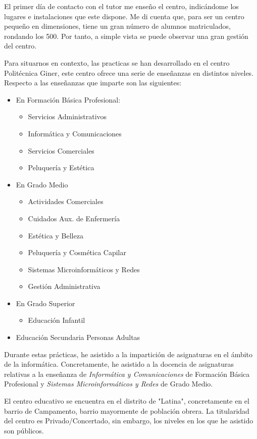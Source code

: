 \documentclass[spanish,12pt, a4paper,twoside]{paper}
\begin{document}
El primer día de contacto con el tutor me enseño el centro, indicándome los lugares e instalaciones que este dispone. Me di cuenta que, para ser un centro pequeño en dimensiones, tiene un gran número de alumnos matriculados, rondando los 500. Por tanto, a simple vista se puede observar una gran gestión del centro.

Para situarnos en contexto, las practicas se han desarrollado en el centro Politécnica Giner, este centro ofrece una serie de enseñanzas en distintos niveles.
Respecto a las enseñanzas que imparte son las siguientes:
\begin{itemize}
\item En Formación Básica Profesional:
\begin{itemize}
\item Servicios Administrativos
\item Informática y Comunicaciones
\item Servicios Comerciales
\item Peluquería y Estética
\end{itemize}
\item En Grado Medio
\begin{itemize}
\item Actividades Comerciales
\item Cuidados Aux. de Enfermería
\item Estética y Belleza
\item Peluquería y Cosmética Capilar
\item Sistemas Microinformáticos y Redes
\item Gestión Administrativa
\end{itemize}
\item En Grado Superior
\begin{itemize}
\item Educación Infantil
\end{itemize}
\item Educación Secundaria Personas Adultas
\end{itemize}

Durante estas prácticas, he asistido a la impartición de asignaturas en el ámbito de la informática. Concretamente, he asistido a la docencia de asignaturas relativas a la enseñanza de \textit{Informática y Comunicaciones} de Formación Básica Profesional y \textit{Sistemas Microinformáticos y Redes} de Grado Medio.

El centro educativo se encuentra en el distrito de "Latina", concretamente en el barrio de Campamento, barrio mayormente de población obrera. La titularidad del centro es Privado/Concertado, sin embargo, los niveles en los que he asistido son públicos. 
\end{document}
